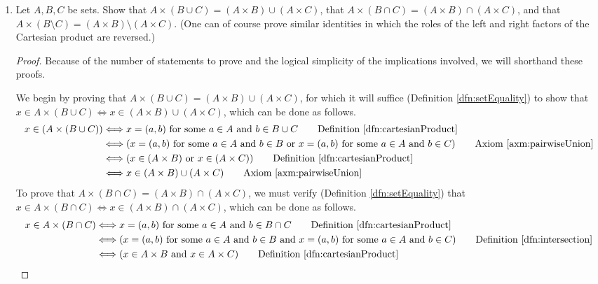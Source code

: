 \documentclass[../main.tex]{subfiles}
\begin{document}
\begin{enumerate}[ref={\thesection.\arabic*}]
\begin{proof}
    \end{proof}
    \item \label{exr:3.5.4}Let $A,B,C$ be sets. Show that $A\times(B\cup C)=(A\times B)\cup(A\times C)$, that $A\times(B\cap C)=(A\times B)\cap(A\times C)$, and that $A\times(B\setminus C)=(A\times B)\setminus(A\times C)$. (One can of course prove similar identities in which the roles of the left and right factors of the Cartesian product are reversed.)
    \begin{proof}
        Because of the number of statements to prove and the logical simplicity of the implications involved, we will shorthand these proofs.\par
        We begin by proving that $A\times(B\cup C)=(A\times B)\cup(A\times C)$, for which it will suffice (Definition \ref{dfn:setEquality}) to show that $x\in A\times(B\cup C) \Longleftrightarrow x\in(A\times B)\cup(A\times C)$, which can be done as follows.
        \begin{align*}
            x\in(A\times(B\cup C)) &\Longleftrightarrow x=(a,b)\text{ for some }a\in A\text{ and }b\in B\cup C \tag*{Definition \ref{dfn:cartesianProduct}}\\
            &\Longleftrightarrow (x=(a,b)\text{ for some }a\in A\text{ and }b\in B\text{ or }x=(a,b)\text{ for some }a\in A\text{ and }b\in C) \tag*{Axiom \ref{axm:pairwiseUnion}}\\
            &\Longleftrightarrow (x\in(A\times B)\text{ or }x\in(A\times C)) \tag*{Definition \ref{dfn:cartesianProduct}}\\
            &\Longleftrightarrow x\in(A\times B)\cup(A\times C) \tag*{Axiom \ref{axm:pairwiseUnion}}
        \end{align*}
        To prove that $A\times(B\cap C)=(A\times B)\cap(A\times C)$, we must verify (Definition \ref{dfn:setEquality}) that $x\in A\times(B\cap C) \Longleftrightarrow x\in(A\times B)\cap(A\times C)$, which can be done as follows.
        \begin{align*}
            x\in A\times(B\cap C) &\Longleftrightarrow x=(a,b)\text{ for some }a\in A\text{ and }b\in B\cap C \tag*{Definition \ref{dfn:cartesianProduct}}\\
            &\Longleftrightarrow (x=(a,b)\text{ for some }a\in A\text{ and }b\in B\text{ and }x=(a,b)\text{ for some }a\in A\text{ and }b\in C) \tag*{Definition \ref{dfn:intersection}}\\
            &\Longleftrightarrow (x\in A\times B\text{ and }x\in A\times C) \tag*{Definition \ref{dfn:cartesianProduct}}\\

\end{align*}
\end{proof}
\end{enumerate}
\end{document}
